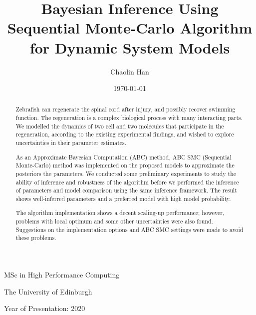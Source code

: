 \documentclass[12pt,a4paper]{report}
\begin{document}

\title{Bayesian Inference Using Sequential Monte-Carlo Algorithm for Dynamic System Models}

\author{Chaolin Han}

\date{\today}

\makeEPCCtitle

\thispagestyle{empty}

\vspace{11cm}

\begin{center}

    \large{MSc in High Performance Computing}

    \large{The University of Edinburgh}

    \large{Year of Presentation: 2020}

\end{center}

\newpage

\begin{abstract}
    Zebrafish can regenerate the spinal cord after injury, and possibly recover swimming function. The regeneration is a complex biological process with many interacting parts. We modelled the dynamics of two cell and two molecules that participate in the regeneration, according to the existing experimental findings\cite{ref:Tsarouchas}, and wished to explore uncertainties in their parameter estimates.
    
    As an Approximate Bayesian Computation (ABC) method, ABC SMC (Sequential Monte-Carlo) method was implemented on the proposed models to approximate the posteriors the parameters. We conducted some preliminary experiments to study the ability of inference and robustness of the algorithm before we performed the inference of parameters and model comparison using the same inference framework. The result shows well-inferred parameters and a preferred model with high model probability.

    The algorithm implementation shows a decent scaling-up performance; however, problems with local optimum and some other uncertainties were also found. Suggestions on the implementation options and ABC SMC settings were made to avoid these problems.
\end{abstract}


\tableofcontents
\listoftables
\listoffigures

\end{document}
